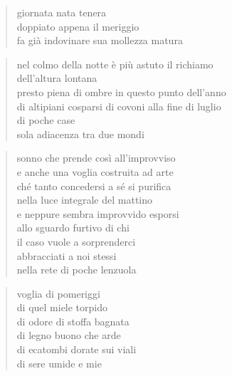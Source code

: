 \clearpage


\begin{verse}
    giornata nata tenera\\
    doppiato appena il meriggio\\
    fa già indovinare sua mollezza matura
\end{verse}

\clearpage


\begin{verse}
    nel colmo della notte è più astuto il richiamo\\
    dell'altura lontana\\
    presto piena di ombre in questo punto dell'anno\\
    di altipiani cosparsi di covoni alla fine di luglio\\
    di poche case\\
    sola adiacenza tra due mondi
\end{verse}

\clearpage


\begin{verse}
    sonno che prende così all'improvviso\\
    e anche una voglia costruita ad arte\\
    ché tanto concedersi a sé si purifica\\
    nella luce integrale del mattino\\
    e neppure sembra improvvido esporsi\\
    allo sguardo furtivo di chi\\
    il caso vuole a sorprenderci\\
    abbracciati a noi stessi\\
    nella rete di poche lenzuola
\end{verse}

\clearpage


\begin{verse}
    voglia di pomeriggi\\
    di quel miele torpido\\
    di odore di stoffa bagnata\\
    di legno buono che arde\\
    di ecatombi dorate sui viali\\
    di sere umide e mie
\end{verse}

